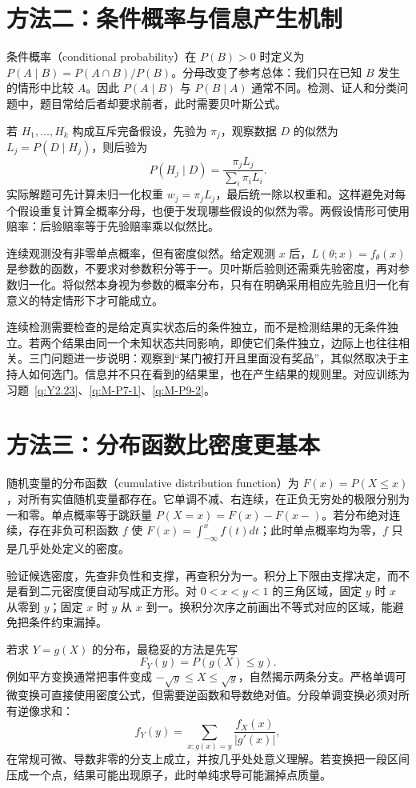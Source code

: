 \documentclass[12pt,fontset=fandol]{ctexart}
\begin{document}
\section*{方法二：条件概率与信息产生机制}
条件概率（conditional probability）在 $P(B)>0$ 时定义为 $P(A\mid B)=P(A\cap B)/P(B)$。分母改变了参考总体：我们只在已知 $B$ 发生的情形中比较 $A$。因此 $P(A\mid B)$ 与 $P(B\mid A)$ 通常不同。检测、证人和分类问题中，题目常给后者却要求前者，此时需要贝叶斯公式。

若 $H_1,\ldots,H_k$ 构成互斥完备假设，先验为 $\pi_j$，观察数据 $D$ 的似然为 $L_j=P(D\mid H_j)$，则后验为
\[
P(H_j\mid D)=\frac{\pi_jL_j}{\sum_i\pi_iL_i}.
\]
实际解题可先计算未归一化权重 $w_j=\pi_jL_j$，最后统一除以权重和。这样避免对每个假设重复计算全概率分母，也便于发现哪些假设的似然为零。两假设情形可使用赔率：后验赔率等于先验赔率乘以似然比。

连续观测没有非零单点概率，但有密度似然。给定观测 $x$ 后，$L(\theta;x)=f_\theta(x)$ 是参数的函数，不要求对参数积分等于一。贝叶斯后验则还需乘先验密度，再对参数归一化。将似然本身视为参数的概率分布，只有在明确采用相应先验且归一化有意义的特定情形下才可能成立。

连续检测需要检查的是给定真实状态后的条件独立，而不是检测结果的无条件独立。若两个结果由同一个未知状态共同影响，即使它们条件独立，边际上也往往相关。三门问题进一步说明：观察到“某门被打开且里面没有奖品”，其似然取决于主持人如何选门。信息并不只在看到的结果里，也在产生结果的规则里。对应训练为习题~\ref{q:Y2.23}、\ref{q:M-P7-1}、\ref{q:M-P9-2}。

\section*{方法三：分布函数比密度更基本}
随机变量的分布函数（cumulative distribution function）为 $F(x)=P(X\le x)$，对所有实值随机变量都存在。它单调不减、右连续，在正负无穷处的极限分别为一和零。单点概率等于跳跃量 $P(X=x)=F(x)-F(x-)$。若分布绝对连续，存在非负可积函数 $f$ 使 $F(x)=\int_{-\infty}^xf(t)dt$；此时单点概率均为零，$f$ 只是几乎处处定义的密度。

验证候选密度，先查非负性和支撑，再查积分为一。积分上下限由支撑决定，而不是看到二元密度便自动写成正方形。对 $0<x<y<1$ 的三角区域，固定 $y$ 时 $x$ 从零到 $y$；固定 $x$ 时 $y$ 从 $x$ 到一。换积分次序之前画出不等式对应的区域，能避免把条件约束漏掉。

若求 $Y=g(X)$ 的分布，最稳妥的方法是先写
\[
F_Y(y)=P(g(X)\le y).
\]
例如平方变换通常把事件变成 $-\sqrt y\le X\le\sqrt y$，自然揭示两条分支。严格单调可微变换可直接使用密度公式，但需要逆函数和导数绝对值。分段单调变换必须对所有逆像求和：
\[
f_Y(y)=\sum_{x:g(x)=y}\frac{f_X(x)}{|g'(x)|},
\]
在常规可微、导数非零的分支上成立，并按几乎处处意义理解。若变换把一段区间压成一个点，结果可能出现原子，此时单纯求导可能漏掉点质量。
\end{document}
